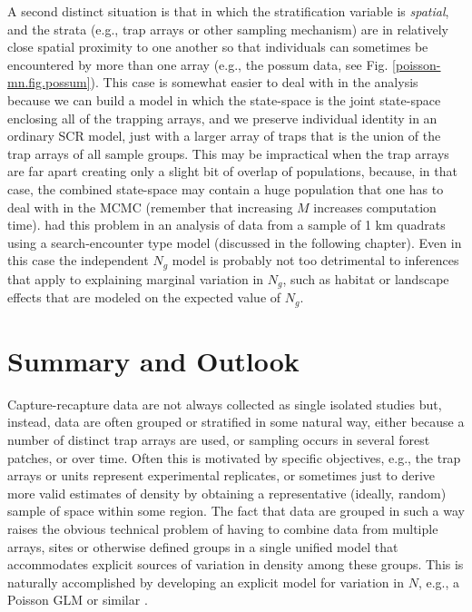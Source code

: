 A second distinct situation is that in which the stratification
variable is {\it spatial}, and the strata (e.g., trap arrays or other
sampling mechanism) are in relatively close spatial proximity to one
another so that individuals can sometimes be encountered by more than
one array (e.g., the possum data, see
Fig. \ref{poisson-mn.fig.possum}). This case is somewhat easier to
deal with in the analysis because we can build a model in which the
state-space is the joint state-space enclosing all of the trapping
arrays, and we preserve individual identity in an ordinary SCR model,
just with a larger array of traps that is the union of the trap arrays
of all sample groups. This may be impractical when the trap arrays are
far apart creating only a slight bit of overlap of populations,
because, in that case, the combined state-space may contain a huge
population that one has to deal with in the MCMC (remember that
increasing $M$ increases computation time).
\citep{royle_etal:2011mee} had this problem in an analysis of data
from a sample of 1 km quadrats using a search-encounter type model
(discussed in the following chapter).  Even in this case the
independent $N_{g}$ model is probably not too detrimental to
inferences that apply to explaining marginal variation in $N_{g}$,
such as habitat or landscape effects that are modeled on the expected
value of $N_{g}$.


\section{Summary and Outlook}

Capture-recapture data are not always collected as single isolated
studies but, instead, data are often grouped or stratified in some
natural way, either because a number of distinct trap arrays are used,
or sampling occurs in several forest patches, or over time. Often this
is motivated by specific objectives, e.g., the trap arrays or units
represent experimental replicates, or sometimes just to derive more
valid estimates of density by obtaining a representative (ideally,
random) sample of space within some region.  The fact that data are
grouped in such a way raises the obvious technical problem of having
to combine data from multiple arrays, sites or otherwise defined
groups in a single unified model that accommodates explicit sources of
variation in density among these groups.  This is naturally
accomplished by developing an explicit model for variation in $N$,
e.g., a Poisson GLM or similar \citep{converse_royle:2012,
  royle_etal:2012arXiv}.

